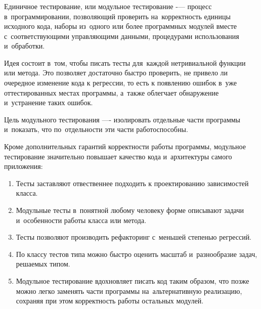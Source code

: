 \subsubsection{}
\label{sec:testing:unit:defenition}

Единичное тестирование, или модульное тестирование -— процесс в~программировании, позволяющий проверить на~корректность единицы исходного кода, наборы из~одного или более программных модулей вместе с~соответствующими управляющими данными, процедурами использования и~обработки.

Идея состоит в~том, чтобы писать тесты для~каждой нетривиальной функции или метода. Это позволяет достаточно быстро проверить, не привело ли очередное изменение кода к регрессии, то есть к появлению ошибок в~уже оттестированных местах программы, а~также облегчает обнаружение и~устранение таких ошибок. 

Цель модульного тестирования —- изолировать отдельные части программы и~показать, что по~отдельности эти части работоспособны\cite{wiki:unit}.

Кроме дополнительных гарантий корректности работы программы, модульное тестирование значительно повышает качество кода и~архитектуры самого приложения:

\begin{enumerate}
	\item Тесты заставляют отвественнее подходить к проектированию зависимостей класса.
	\item Модульные тесты в~понятной любому человеку форме описывают задачи и~особенности работы класса или метода.
	\item Тесты позволяют производить рефакторинг с~меньшей степенью регрессий.
	\item По классу тестов типа можно быстро оценить масштаб и~разнообразие задач, решаемых типом.
	\item Модульное тестирование вдохновляет писать код таким образом, что позже можно легко заменять части программы на~альтернативную реализацию, сохраняя при этом корректность работы остальных модулей.
\end{enumerate}

